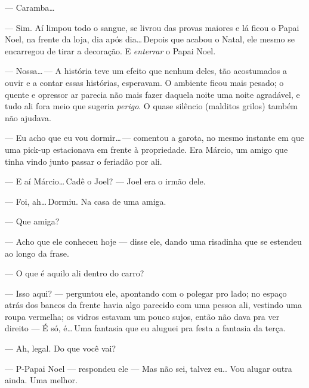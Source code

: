 --- Caramba\ldots

--- Sim. Aí limpou todo o sangue, se livrou das provas maiores e lá ficou o Papai Noel, na frente da loja, dia após dia\ldots\,De\-pois que acabou o Natal, ele mesmo se encarregou de tirar a decoração. E \emph{enterrar} o Papai Noel.

--- Nossa\ldots\,--- A história teve um efeito que nenhum deles, tão acostumados a ouvir e a contar essas histórias, esperavam. O ambiente ficou mais pesado; o quente e opressor ar parecia não mais fazer daquela noite uma noite agradável, e tudo ali fora meio que sugeria \emph{perigo}. O quase silêncio (malditos grilos) também não ajudava.

--- Eu acho que eu vou dormir\ldots\,--- comentou a garota, no mesmo instante em que uma pick-up estacionava em frente à propriedade. Era Márcio, um amigo que tinha vindo junto passar o feriadão por ali.

--- E aí Márcio\ldots\,Cadê o Joel? --- Joel era o irmão dele.

--- Foi, ah\ldots\,Dormiu. Na casa de uma amiga.

--- Que amiga?

--- Acho que ele conheceu hoje --- disse ele, dando uma risadinha que se estendeu ao longo da frase.

--- O que é aquilo ali dentro do carro?

--- Isso aqui? --- perguntou ele, apontando com o polegar pro lado; no espaço atrás dos bancos da frente havia algo parecido com uma pessoa ali, vestindo uma roupa vermelha; os vidros estavam um pouco sujos, então não dava pra ver direito --- É só, é\ldots\,Uma fantasia que eu aluguei pra festa a fantasia da terça.

--- Ah, legal. Do que você vai?

--- P-Papai Noel --- respondeu ele --- Mas não sei, talvez eu.. Vou alugar outra ainda. Uma melhor.
